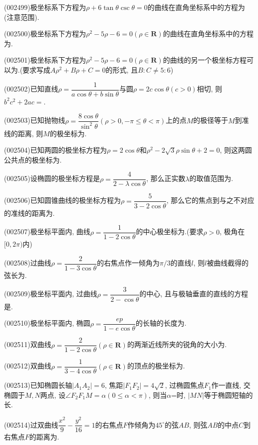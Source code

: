 \item (002499)极坐标系下方程为$\rho+6\tan \theta\csc\theta=0$的曲线在直角坐标系中的方程为(注意范围).
\item (002500)极坐标系下方程为$\rho^2-5\rho-6=0(\rho\in \mathbf{R})$的曲线在直角坐标系中的方程为.
\item (002501)极坐标系下方程为$\rho^2-5\rho-6=0(\rho\in \mathbf{R})$的曲线的另一个极坐标方程可以为.(要求写成$A\rho^2+B\rho+C=0$的形式, 且$B:C\ne 5:6$)
\item (002502)已知直线$\rho=\dfrac{1}{a\cos\theta+b\sin\theta}$与圆$\rho=2c\cos\theta(c>0)$相切, 则$b^2c^2+2ac=$.
\item (002503)已知抛物线$\rho=\dfrac{8\cos\theta}{\sin^2\theta}(\rho>0, -\pi\le \theta<\pi)$上的点$M$的极径等于$M$到准线的距离, 则$M$的极坐标为.
\item (002504)已知两圆的极坐标方程为$\rho=2\cos\theta$和$\rho^2-2\sqrt{3}\rho \sin\theta+2=0$, 则这两圆公共点的极坐标为.
\item (002505)设椭圆的极坐标方程是$\rho=\dfrac{4}{2-\lambda \cos\theta}$, 那么正实数$\lambda$的取值范围为.
\item (002506)已知圆锥曲线的极坐标方程为$\rho=\dfrac{5}{3-2\cos\theta}$, 那么它的焦点到与之不对应的准线的距离为.
\item (002507)极坐标平面内, 曲线$\rho=\dfrac{1}{1-2\cos\theta}$的中心极坐标为.(要求$\rho>0$, 极角在$[0,2\pi)$内)
\item (002508)过曲线$\rho=\dfrac{2}{1-3\cos\theta}$的右焦点作一倾角为$\pi/3$的直线$l$, 则$l$被曲线截得的弦长为.
\item (002509)极坐标平面内, 过曲线$\rho=\dfrac{3}{2-\cos\theta}$的中心, 且与极轴垂直的直线的方程是.
\item (002510)极坐标平面内, 椭圆$\rho=\dfrac{ep}{1-e\cos\theta}$的长轴的长度为.
\item (002511)双曲线$\rho=\dfrac{2}{1-2\cos\theta}(\rho\in\mathbf{R})$的两渐近线所夹的锐角的大小为.
\item (002512)双曲线$\rho=\dfrac{1}{3-4\cos\theta}(\rho\in \mathbf{R})$的顶点的极坐标为.
\item (002513)已知椭圆长轴$|A_1A_2|=6$, 焦距$|F_1F_2|=4\sqrt{2}$, 过椭圆焦点$F_1$作一直线, 交椭圆于$M,N$两点, 设$\angle F_2F_1M=\alpha(0\le \alpha<\pi)$, 则当$\alpha$=时, $|MN|$等于椭圆短轴的长.
\item (002514)过双曲线$\dfrac{x^2}{9}-\dfrac{y^2}{16}=1$的右焦点$F$作倾角为$45^\circ$的弦$AB$, 则弦$AB$的中点$C$到右焦点$F$的距离为.
